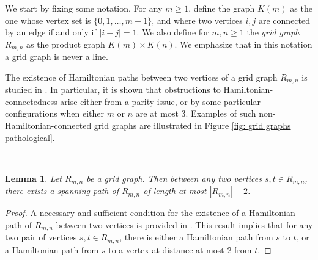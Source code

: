 \documentclass[reqno,oneside]{amsart}
\theoremstyle{plain}
\newtheorem{lem}[thm]{Lemma}
\theoremstyle{definition}
\begin{document}
We start by fixing some notation. For any $m\ge 1$, define the graph $K(m)$ as the one whose vertex set is $\{0,1,\ldots,m-1\}$, and where two vertices $i,j$ are connected by an edge if and only if $|i-j|=1$. We also define for $m,n\ge 1$ the \textit{grid graph} $R_{m,n}$ as the product graph $K(m)\times K(n)$. We emphasize that in this notation a grid graph is never a line.


The existence of Hamiltonian paths between two vertices of a grid graph $R_{m,n}$ is studied in \cite{ItaiPapadimitriouSzwarcfiter1982}. In particular, it is shown that obstructions to Hamiltonian-connectedness arise either from a parity issue, or by some particular configurations when either $m$ or $n$ are at most $3$. Examples of such non-Hamiltonian-connected grid graphs are illustrated in Figure \ref{fig: grid graphs pathological}.
\begin{figure*}[h!]
	\centering
	\begin{subfigure}[t]{0.4\textwidth}
		\centering
		\resizebox{1\textwidth}{!}{
			}
		\caption{}
	\end{subfigure}%
	~ 
	\begin{subfigure}[t]{0.4\textwidth}
		\centering
		\resizebox{1\textwidth}{!}{
			}
		\caption{}
	\end{subfigure}
	\caption{There are no Hamiltonian paths from $u$ to $v$ in these grid graphs.}
	\label{fig: grid graphs pathological}
\end{figure*}

\begin{lem}\label{lem: Itai grid graphs} Let $R_{m,n}$ be a grid graph. Then between any two vertices $s,t\in R_{m,n}$, there exists a spanning path of $R_{m,n}$ of length at most $|R_{m,n}|+2$.
\end{lem}
\begin{proof}
	A necessary and sufficient condition for the existence of a Hamiltonian path of $R_{m,n}$ between two vertices is provided in \cite[Theorem 3.2]{ItaiPapadimitriouSzwarcfiter1982}. This result implies that for any two pair of vertices $s,t\in R_{m,n}$, there is either a Hamiltonian path from $s$ to $t$, or a Hamiltonian path from $s$ to a vertex at distance at most $2$ from $t$.
\end{proof}
\end{document}
